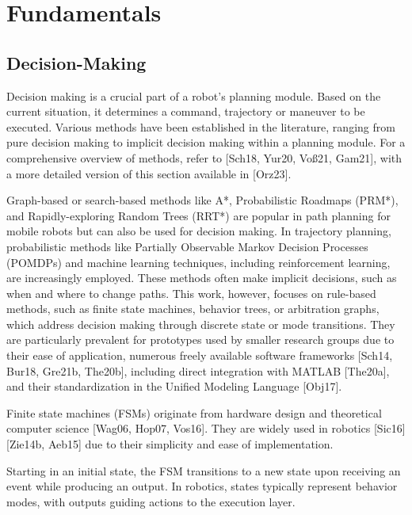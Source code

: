 
\section{Fundamentals}


\subsection{Decision-Making}

Decision making is a crucial part of a robot's planning module.
Based on the current situation, it determines a command, trajectory or maneuver to be executed.
Various methods have been established in the literature, ranging from pure decision making to implicit decision making within a planning module.
For a comprehensive overview of methods, refer to [Sch18, Yur20, Voß21, Gam21], with a more detailed version of this section available in [Orz23].

Graph-based or search-based methods like A*, Probabilistic Roadmaps (PRM*), and Rapidly-exploring Random Trees (RRT*) are popular in path planning for mobile robots but can also be used for decision making.
In trajectory planning, probabilistic methods like Partially Observable Markov Decision Processes (POMDPs) and machine learning techniques, including reinforcement learning, are increasingly employed.
These methods often make implicit decisions, such as when and where to change paths.
This work, however, focuses on rule-based methods, such as finite state machines, behavior trees, or arbitration graphs, which address decision making through discrete state or mode transitions.
They are particularly prevalent for prototypes used by smaller research groups due to their ease of application, numerous freely available software frameworks [Sch14, Bur18, Gre21b, The20b], including direct integration with MATLAB [The20a], and their standardization in the Unified Modeling Language [Obj17].

Finite state machines (FSMs) originate from hardware design and theoretical computer science [Wag06, Hop07, Vos16].
They are widely used in robotics [Sic16] [Zie14b, Aeb15] due to their simplicity and ease of implementation.

Starting in an initial state, the FSM transitions to a new state upon receiving an event while producing an output.
In robotics, states typically represent behavior modes, with outputs guiding actions to the execution layer.

